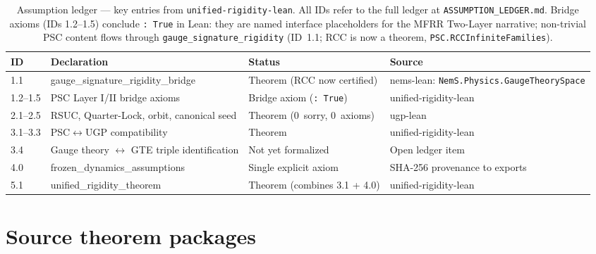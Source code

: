 \documentclass[11pt,twocolumn]{article}
\theoremstyle{remark}
\begin{document}
\begin{table}[t]
\centering
\small
\renewcommand{\arraystretch}{1.25}
\caption{Assumption ledger --- key entries from \texttt{unified-rigidity-lean}.
All IDs refer to the full ledger at \texttt{ASSUMPTION\_LEDGER.md}.
Bridge axioms (IDs 1.2--1.5) conclude \texttt{:~True} in Lean: they are named interface
placeholders for the MFRR Two-Layer narrative; non-trivial PSC content flows through
\texttt{gauge\_signature\_rigidity} (ID~1.1; RCC is now a theorem, \texttt{PSC.RCCInfiniteFamilies}).}
\label{tab:assumption-ledger}
\begin{tabularx}{\linewidth}{@{}l >{\raggedright\arraybackslash\ttfamily}p{5.2cm} >{\raggedright\arraybackslash}p{4.0cm} >{\raggedright\arraybackslash}X@{}}
\toprule
\textbf{ID} & \textbf{Declaration} & \textbf{Status} & \textbf{Source} \\
\midrule
1.1   & gauge\_signature\_\allowbreak rigidity\_bridge & Theorem (RCC now certified) & nems-lean: \texttt{NemS.Physics.\allowbreak GaugeTheorySpace} \\
1.2--1.5 & PSC Layer I/II bridge axioms & Bridge axiom (\texttt{:~True}) & unified-rigidity-lean \\
2.1--2.5 & RSUC, Quarter-Lock, orbit, canonical seed & Theorem (0~sorry, 0~axioms) & ugp-lean \\
3.1--3.3 & PSC$\leftrightarrow$UGP compatibility & Theorem & unified-rigidity-lean \\
3.4   & Gauge theory $\leftrightarrow$ GTE triple identification & Not yet formalized & Open ledger item \\
4.0   & frozen\_dynamics\_assumptions & Single explicit axiom & SHA-256 provenance to exports \\
5.1   & unified\_rigidity\_theorem & Theorem (combines 3.1 + 4.0) & unified-rigidity-lean \\
\bottomrule
\end{tabularx}
\end{table}

\section{Source theorem packages}
\end{document}
